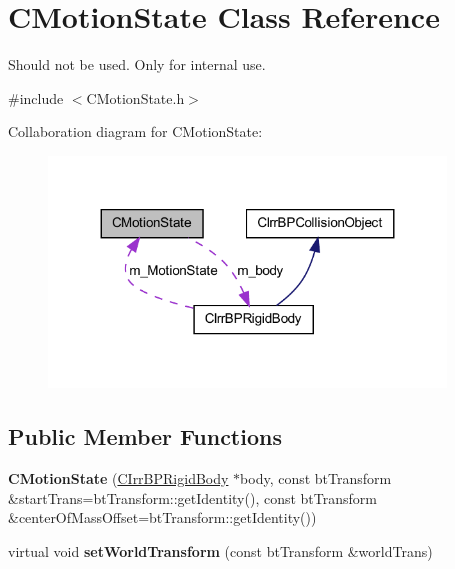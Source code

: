 \hypertarget{class_c_motion_state}{
\section{CMotionState Class Reference}
\label{class_c_motion_state}
}


Should not be used. Only for internal use.  




{\ttfamily \#include $<$CMotionState.h$>$}



Collaboration diagram for CMotionState:\nopagebreak
\begin{figure}[H]
\begin{center}
\leavevmode
\includegraphics[width=299pt]{class_c_motion_state__coll__graph}
\end{center}
\end{figure}
\subsection*{Public Member Functions}
\begin{DoxyCompactItemize}
\item 
\hypertarget{class_c_motion_state_a0352d243092a662ad672cf5621040adf}{
{\bfseries CMotionState} (\hyperlink{class_c_irr_b_p_rigid_body}{CIrrBPRigidBody} $\ast$body, const btTransform \&startTrans=btTransform::getIdentity(), const btTransform \&centerOfMassOffset=btTransform::getIdentity())}
\label{class_c_motion_state_a0352d243092a662ad672cf5621040adf}

\item 
\hypertarget{class_c_motion_state_a25a63325dc9bd847440d0fc83af77ee6}{
virtual void {\bfseries setWorldTransform} (const btTransform \&worldTrans)}
\label{class_c_motion_state_a25a63325dc9bd847440d0fc83af77ee6}

\end{DoxyCompactItemize}
